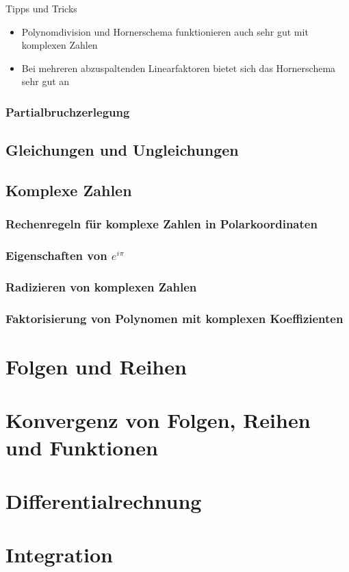 \documentclass[german]{spicker}
\begin{document}
\begin{bonus}{Tipps und Tricks}
    \begin{itemize}
        \item Polynomdivision und Hornerschema funktionieren auch sehr gut mit komplexen Zahlen
        \item Bei mehreren abzuspaltenden Linearfaktoren bietet sich das Hornerschema sehr gut an
    \end{itemize}
\end{bonus}

\subsubsection{Partialbruchzerlegung}

\subsection{Gleichungen und Ungleichungen}

\subsection{Komplexe Zahlen}
\subsubsection{Rechenregeln für komplexe Zahlen in Polarkoordinaten}

\subsubsection{Eigenschaften von $e^{i\pi}$}

\subsubsection{Radizieren von komplexen Zahlen}

\subsubsection{Faktorisierung von Polynomen mit komplexen Koeffizienten}

\section{Folgen und Reihen}

\section{Konvergenz von Folgen, Reihen und Funktionen}

\section{Differentialrechnung}

\section{Integration}
\end{document}
